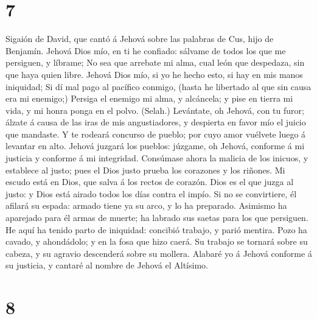 \hypertarget{section-6}{%
\section{7}\label{section-6}}

 Sigaión de David, que cantó á Jehová sobre las palabras
de Cus, hijo de Benjamín. Jehová Dios mío, en ti he confiado: sálvame de
todos los que me persiguen, y líbrame;  No sea que
arrebate mi alma, cual león que despedaza, sin que haya quien libre.
 Jehová Dios mío, si yo he hecho esto, si hay en mis manos
iniquidad;  Si dí mal pago al pacífico conmigo, (hasta he
libertado al que sin causa era mi enemigo;)  Persiga el
enemigo mi alma, y alcáncela; y pise en tierra mi vida, y mi honra ponga
en el polvo. (Selah.)  Levántate, oh Jehová, con tu furor;
álzate á causa de las iras de mis angustiadores, y despierta en favor
mío el juicio que mandaste.  Y te rodeará concurso de
pueblo; por cuyo amor vuélvete luego á levantar en alto. 
Jehová juzgará los pueblos: júzgame, oh Jehová, conforme á mi justicia y
conforme á mi integridad.  Consúmase ahora la malicia de
los inicuos, y establece al justo; pues el Dios justo prueba los
corazones y los riñones.  Mi escudo está en Dios, que
salva á los rectos de corazón.  Dios es el que juzga al
justo: y Dios está airado todos los días contra el impío.
 Si no se convirtiere, él afilará su espada: armado tiene
ya su arco, y lo ha preparado.  Asimismo ha aparejado
para él armas de muerte; ha labrado sus saetas para los que persiguen.
 He aquí ha tenido parto de iniquidad: concibió trabajo,
y parió mentira.  Pozo ha cavado, y ahondádolo; y en la
fosa que hizo caerá.  Su trabajo se tornará sobre su
cabeza, y su agravio descenderá sobre su mollera. 
Alabaré yo á Jehová conforme á su justicia, y cantaré al nombre de
Jehová el Altísimo.

\hypertarget{section-7}{%
\section{8}\label{section-7}}

